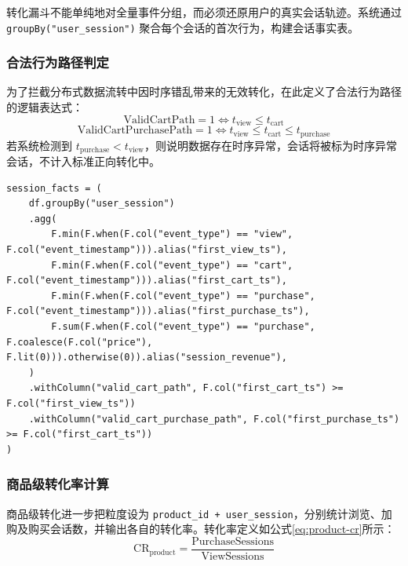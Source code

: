 转化漏斗不能单纯地对全量事件分组，而必须还原用户的真实会话轨迹。系统通过 \texttt{groupBy("user\_session")} 聚合每个会话的首次行为，构建会话事实表。

\subsubsection{合法行为路径判定}

为了拦截分布式数据流转中因时序错乱带来的无效转化，在此定义了合法行为路径的逻辑表达式：
\begin{equation}
    \text{ValidCartPath} = 1 \iff t_{\text{view}} \le t_{\text{cart}}
    \label{eq:valid-cart-path}
\end{equation}
\begin{equation}
    \text{ValidCartPurchasePath} = 1 \iff t_{\text{view}} \le t_{\text{cart}} \le t_{\text{purchase}}
    \label{eq:valid-cart-purchase-path}
\end{equation}
若系统检测到 $t_{\text{purchase}} < t_{\text{view}}$，则说明数据存在时序异常，会话将被标为时序异常会话，不计入标准正向转化中。

\begin{lstlisting}[style=codexcode]
session_facts = (
    df.groupBy("user_session")
    .agg(
        F.min(F.when(F.col("event_type") == "view", F.col("event_timestamp"))).alias("first_view_ts"),
        F.min(F.when(F.col("event_type") == "cart", F.col("event_timestamp"))).alias("first_cart_ts"),
        F.min(F.when(F.col("event_type") == "purchase", F.col("event_timestamp"))).alias("first_purchase_ts"),
        F.sum(F.when(F.col("event_type") == "purchase", F.coalesce(F.col("price"), F.lit(0))).otherwise(0)).alias("session_revenue"),
    )
    .withColumn("valid_cart_path", F.col("first_cart_ts") >= F.col("first_view_ts"))
    .withColumn("valid_cart_purchase_path", F.col("first_purchase_ts") >= F.col("first_cart_ts"))
)
\end{lstlisting}

\subsubsection{商品级转化率计算}

商品级转化进一步把粒度设为 \texttt{product\_id + user\_session}，分别统计浏览、加购及购买会话数，并输出各自的转化率。转化率定义如公式\eqref{eq:product-cr}所示：
\begin{equation}
    \text{CR}_{\text{product}} = \frac{\text{PurchaseSessions}}{\text{ViewSessions}}
    \label{eq:product-cr}
\end{equation}

